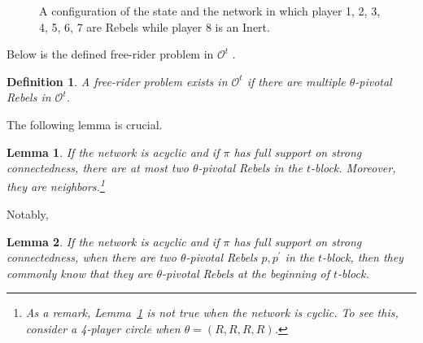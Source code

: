 \documentclass[12pt,letter]{article}
\newcommand{\Omicron}{\mathcal{O}}
\newtheorem{lemma}{Lemma}[section]
\newtheorem{definition}{Definition}[section]
\theoremstyle{definition}
\theoremstyle{remark}
\theoremstyle{claim}
\begin{document}
\begin{figure}


\begin{center}
\end{center}
\caption{A configuration of the state and the network in which player 1, 2, 3, 4, 5, 6, 7 are Rebels while player 8 is an Inert.}
\label{fig:k-1_pivotal}
\end{figure}

Below is the defined free-rider problem in $\Omicron^t$ .

\begin{definition}
A free-rider problem exists in $\Omicron^t$ if there are multiple $\theta$-pivotal Rebels in $\Omicron^t$.
\end{definition}



The following lemma is crucial. 
\begin{lemma}
\label{lemma_at_most_two_nodes}
If the network is acyclic and if $\pi$ has full support on strong connectedness, there are at most two $\theta$-pivotal Rebels in the $t$-block. Moreover, they are neighbors.\footnote{As a remark, Lemma~\ref{lemma_at_most_two_nodes} is not true when the network is cyclic. To see this, consider a 4-player circle when $\theta=(R,R,R,R)$.}
\end{lemma}

Notably,

\begin{lemma}
\label{lemman_pivotals_CK}
If the network is acyclic and if $\pi$ has full support on strong connectedness, when there are two $\theta$-pivotal Rebels $p,p^{'}$ in the $t$-block, then they commonly know that they are $\theta$-pivotal Rebels at the beginning of $t$-block.
\end{lemma}
\end{document}
